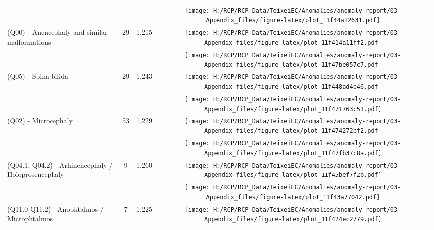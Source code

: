 \documentclass[
]{krantz}
\begin{document}
\begin{longtable}[t]{>{\raggedright\arraybackslash}m{4cm}cc>{}c}
\endfoot
\bottomrule
\endlastfoot
\cellcolor{gray!6}{Neural tube defects} & \cellcolor{gray!6}{64} & \cellcolor{gray!6}{1.226} & \cellcolor{gray!6}{}\texttt{[image: H:/RCP/RCP\_Data/TeixeiEC/Anomalies/anomaly-report/03-Appendix\_files/figure-latex/plot\_11f44a12631.pdf]}\\
(Q00) - Anencephaly and similar malformations & 29 & 1.215 & \texttt{[image: H:/RCP/RCP\_Data/TeixeiEC/Anomalies/anomaly-report/03-Appendix\_files/figure-latex/plot\_11f414a11ff2.pdf]}\\
\cellcolor{gray!6}{(Q01) - Encephalocele} & \cellcolor{gray!6}{6} & \cellcolor{gray!6}{1.204} & \cellcolor{gray!6}{}\texttt{[image: H:/RCP/RCP\_Data/TeixeiEC/Anomalies/anomaly-report/03-Appendix\_files/figure-latex/plot\_11f47be057c7.pdf]}\\
(Q05) - Spina bifida & 29 & 1.243 & \texttt{[image: H:/RCP/RCP\_Data/TeixeiEC/Anomalies/anomaly-report/03-Appendix\_files/figure-latex/plot\_11f448ad4b46.pdf]}\\
\cellcolor{gray!6}{Selected central nervous system defects} & \cellcolor{gray!6}{108} & \cellcolor{gray!6}{1.228} & \cellcolor{gray!6}{}\texttt{[image: H:/RCP/RCP\_Data/TeixeiEC/Anomalies/anomaly-report/03-Appendix\_files/figure-latex/plot\_11f471763c51.pdf]}\\
\addlinespace
(Q02) - Microcephaly & 53 & 1.229 & \texttt{[image: H:/RCP/RCP\_Data/TeixeiEC/Anomalies/anomaly-report/03-Appendix\_files/figure-latex/plot\_11f474272bf2.pdf]}\\
\cellcolor{gray!6}{(Q03) - Congenital hydrocephalus} & \cellcolor{gray!6}{50} & \cellcolor{gray!6}{1.225} & \cellcolor{gray!6}{}\texttt{[image: H:/RCP/RCP\_Data/TeixeiEC/Anomalies/anomaly-report/03-Appendix\_files/figure-latex/plot\_11f47fb37c8a.pdf]}\\
(Q04.1, Q04.2) - Arhinencephaly / Holoprosencephaly & 9 & 1.260 & \texttt{[image: H:/RCP/RCP\_Data/TeixeiEC/Anomalies/anomaly-report/03-Appendix\_files/figure-latex/plot\_11f45bef7f2b.pdf]}\\
\cellcolor{gray!6}{Selected sense organ defects} & \cellcolor{gray!6}{28} & \cellcolor{gray!6}{1.214} & \cellcolor{gray!6}{}\texttt{[image: H:/RCP/RCP\_Data/TeixeiEC/Anomalies/anomaly-report/03-Appendix\_files/figure-latex/plot\_11f43a77042.pdf]}\\
(Q11.0-Q11.2) - Anophtalmos / Microphtalmos & 7 & 1.225 & \texttt{[image: H:/RCP/RCP\_Data/TeixeiEC/Anomalies/anomaly-report/03-Appendix\_files/figure-latex/plot\_11f424ec2779.pdf]}\\

\end{longtable}
\end{document}
